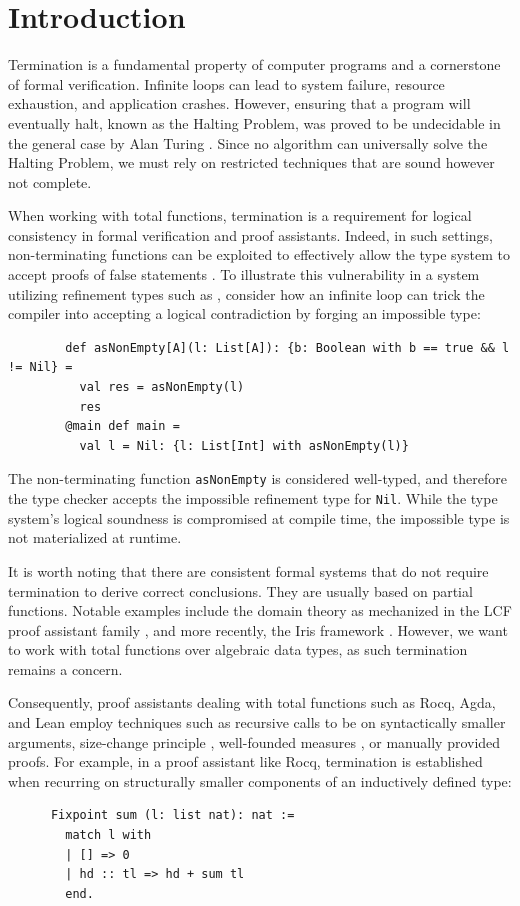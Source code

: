 \chapter{Introduction}

Termination is a fundamental property of computer programs and a cornerstone of
formal verification. Infinite loops can lead to system failure, resource
exhaustion, and application crashes.
However, ensuring that a program will eventually halt, known as the Halting
Problem, was proved to be undecidable in the general case by Alan Turing
\cite{Turing1937}. Since no algorithm can universally solve the Halting Problem,
we must rely on restricted techniques that are sound however not complete.

When working with total functions, termination is a requirement for logical
consistency in formal verification and proof assistants.
Indeed, in such settings, non-terminating functions can be exploited to
effectively allow the type system to accept proofs of false statements
\cite{InfFalse}.
To illustrate this vulnerability in a system utilizing refinement types such as
\cite{RefType}, consider how an infinite loop can trick the compiler into
accepting a logical contradiction by forging an impossible type:
\begin{verbatim}
        def asNonEmpty[A](l: List[A]): {b: Boolean with b == true && l != Nil} =
          val res = asNonEmpty(l)
          res
        @main def main =
          val l = Nil: {l: List[Int] with asNonEmpty(l)}
\end{verbatim}
The non-terminating function \texttt{asNonEmpty} is considered well-typed,
and therefore the type checker accepts the impossible refinement type for
\texttt{Nil}. While the type system's logical soundness is compromised at
compile time, the impossible type is not materialized at runtime.

It is worth noting that there are consistent formal systems that do not require
termination to derive correct conclusions. They are usually based on partial
functions. Notable examples include the domain theory as mechanized in the LCF
proof assistant family \cite{LCFtoHOL}, and more recently, the Iris framework
\cite{Iris}. However, we want to work with total functions over algebraic
data types, as such termination remains a concern.

Consequently, proof assistants dealing with total
functions such as Rocq, Agda, and Lean employ techniques such as recursive calls
to be on syntactically smaller arguments, size-change principle
\cite{SizeChange}, well-founded measures \cite{wellfoundedRelation}, or manually
provided proofs.
For example, in a proof assistant like Rocq, termination is established when
recurring on structurally smaller components of an inductively defined type:
\begin{verbatim}
      Fixpoint sum (l: list nat): nat :=
        match l with
        | [] => 0
        | hd :: tl => hd + sum tl
        end.
\end{verbatim}

